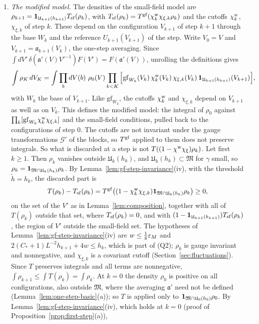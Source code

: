 \begin{remark}
\begin{enumerate}[label=(\alph*)]
\item \emph{The modified model.} The densities of the small-field model are $\rho_{k+1}=\mathbf 1_{\mathfrak U_{k+1}(h_{k+1})}T_{\rm sf}(\rho_k)$, with $T_{\rm sf}(\rho_k)=T^{\rm gf}(\chi^{\rm w}_k\chi_{\xi,k}\rho_k)$ and the cutoffs $\chi^{\rm w}_k$, $\chi_{\xi,k}$ of step $k$. These depend on the configuration $V_{k+1}$ of step $k+1$ through the base $W_k$ and the reference $U_{k+1}(V_{k+1})$ of the step. Write $V_0=V$ and $V_{k+1}=\mathfrak a_{k+1}(V_k)$, the one-step averaging. Since $\int dV'\,\delta(\mathfrak a'(V)V'^{-1})F(V')=F(\mathfrak a'(V))$, unrolling the definitions gives
\[
\int\rho_K\,dV_K=\int\prod_bdV(b)\ \rho_0(V)\prod_{k<K}\Big[\mathrm{gf}_{W_k}(V_k)\,\chi^{\rm w}_k(V_k)\,\chi_{\xi,k}(V_k)\,\one_{\mathfrak U_{k+1}(h_{k+1})}(V_{k+1})\Big],
\]
with $W_k$ the base of $V_{k+1}$. Like $\mathrm{gf}_{W_k}$, the cutoffs $\chi^{\rm w}_k$ and $\chi_{\xi,k}$ depend on $V_{k+1}$ as well as on $V_k$. This defines the modified model: the integral of $\rho_0$ against $\prod_k[\mathrm{gf}_{W_k}\chi^{\rm w}_k\chi_{\xi,k}]$ and the small-field conditions, pulled back to the configurations of step $0$. The cutoffs are not invariant under the gauge transformations $\mathcal G'$ of the blocks, so $T^{\rm gf}$ applied to them does not preserve integrals. So what is discarded at a step is not $T((1-\chi^{\rm w}\chi_\xi)\rho_k)$. Let first $k\ge1$. Then $\rho_k$ vanishes outside $\mathfrak U_k(h_k)$, and $\mathfrak U_k(h_k)\subset\mathfrak M$ for $\gamma$ small, so $\rho_k=\mathbf 1_{\mathfrak M\cap\mathfrak U_k(h_k)}\rho_k$. By Lemma~\ref{lem:gf-step-invariance}(iv), with the threshold $\tilde h=h_k$, the discarded part is
\[
T(\rho_k)-T_{\rm sf}(\rho_k)=T^{\rm gf}\big((1-\chi^{\rm w}_k\chi_{\xi,k})\mathbf 1_{\mathfrak M\cap\mathfrak U_k(h_k)}\rho_k\big)\ge0,
\]
on the set of the $V'$ as in Lemma~\ref{lem:composition}, together with all of $T(\rho_k)$ outside that set, where $T_{\rm sf}(\rho_k)=0$, and with $(1-\mathbf 1_{\mathfrak U_{k+1}(h_{k+1})})T_{\rm sf}(\rho_k)$, the region of $V'$ outside the small-field set. The hypotheses of Lemma~\ref{lem:gf-step-invariance}(iv) are $w\le\frac18\varepsilon_M$ and $2(C_*+1)L^{-2}h_{k+1}+4w\le h_k$, which is part of (Q2); $\rho_k$ is gauge invariant and nonnegative, and $\chi_{\xi,k}$ is a covariant cutoff (Section~\ref{sec:fluctuations}). Since $T$ preserves integrals and all terms are nonnegative, $\int\rho_{k+1}\le\int T(\rho_k)=\int\rho_k$. At $k=0$ the density $\rho_0$ is positive on all configurations, also outside $\mathfrak M$, where the averaging $\mathfrak a'$ need not be defined (Lemma~\ref{lem:one-step-basic}(a)); so $T$ is applied only to $\mathbf 1_{\mathfrak M\cap\mathfrak U_0(h_0)}\rho_0$. By Lemma~\ref{lem:gf-step-invariance}(iv), which holds at $k=0$ (proof of Proposition~\ref{prop:first-step}(a)),

\end{enumerate}
\end{remark}
